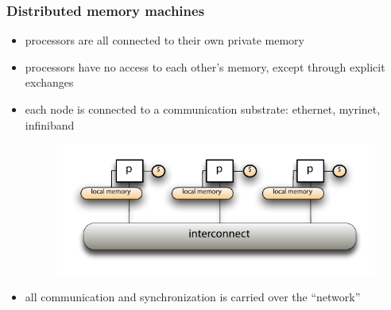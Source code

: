 \begin{frame}[fragile]
%
  \frametitle{Distributed memory machines}
%
  \begin{itemize}
%
  \item processors are all connected to their own private memory
  \item processors have no access to each other's memory, except through explicit exchanges
  \item each node is connected to a communication substrate: ethernet, myrinet, infiniband
%
  \begin{figure}
    \centering
    \includegraphics[width=.90\linewidth]{figures/distributed-memory.pdf}
    \label{fig:distributed-memory}
  \end{figure}
%
  \item all communication and synchronization is carried over the ``network''
%
  \end{itemize}
%
\end{frame}

